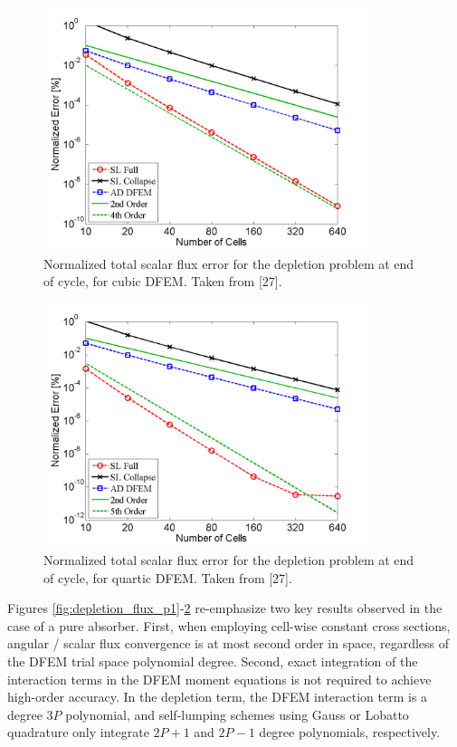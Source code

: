 \begin{figure}[!hbp]
\centering
\includegraphics[width=9.5cm]{chapter5_depletion/Flux_P3_norm_err.png}
\caption{Normalized total scalar flux error for the depletion problem at end of cycle, for cubic DFEM.  Taken from [27].}
\label{fig:depletion_flux_p3}
\end{figure}

\pagebreak

\begin{figure}[!htp]
\centering
\includegraphics[width=9.5cm]{chapter5_depletion/Flux_P4_norm_err.png}
\caption{Normalized total scalar flux error for the depletion problem at end of cycle, for quartic DFEM.  Taken from [27].}
\label{fig:depletion_flux_p4}
\end{figure}

Figures \ref{fig:depletion_flux_p1}-\ref{fig:depletion_flux_p4} re-emphasize two key results observed in the case of a pure absorber.
First, when employing cell-wise constant cross sections, angular / scalar flux convergence is at most second order in space, regardless of the DFEM trial space polynomial degree.
Second, exact integration of the interaction terms in the DFEM moment equations is not required to achieve high-order accuracy.
In the depletion term, the DFEM interaction term is a degree $3P$ polynomial, and self-lumping schemes using Gauss or Lobatto quadrature only integrate $2P+1$ and $2P-1$ degree polynomials, respectively.

